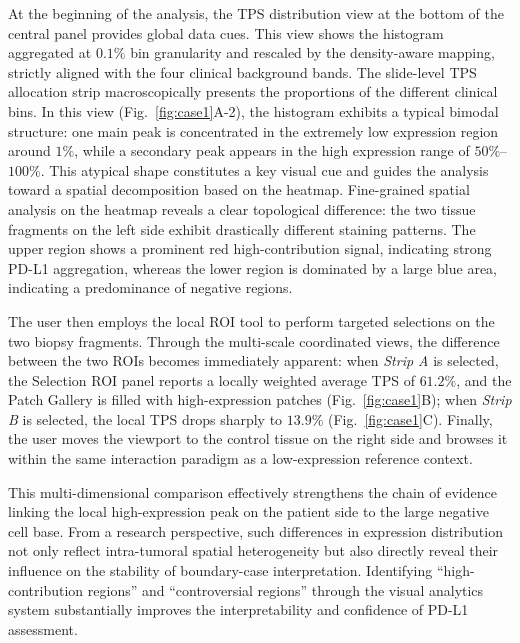 \documentclass[journal]{vgtc}                     %
\begin{document}
At the beginning of the analysis, the TPS distribution view at the bottom of the central panel provides global data cues. This view shows the histogram aggregated at $0.1\%$ bin granularity and rescaled by the density-aware mapping, strictly aligned with the four clinical background bands. The slide-level TPS allocation strip macroscopically presents the proportions of the different clinical bins. In this view (Fig.~\ref{fig:case1}A-2), the histogram exhibits a typical bimodal structure: one main peak is concentrated in the extremely low expression region around $1\%$, while a secondary peak appears in the high expression range of $50\%$--$100\%$. This atypical shape constitutes a key visual cue and guides the analysis toward a spatial decomposition based on the heatmap. Fine-grained spatial analysis on the heatmap reveals a clear topological difference: the two tissue fragments on the left side exhibit drastically different staining patterns. The upper region shows a prominent red high-contribution signal, indicating strong PD-L1 aggregation, whereas the lower region is dominated by a large blue area, indicating a predominance of negative regions.

The user then employs the local ROI tool to perform targeted selections on the two biopsy fragments. Through the multi-scale coordinated views, the difference between the two ROIs becomes immediately apparent: when \textit{Strip A} is selected, the Selection ROI panel reports a locally weighted average TPS of $61.2\%$, and the Patch Gallery is filled with high-expression patches (Fig.~\ref{fig:case1}B); when \textit{Strip B} is selected, the local TPS drops sharply to $13.9\%$ (Fig.~\ref{fig:case1}C). Finally, the user moves the viewport to the control tissue on the right side and browses it within the same interaction paradigm as a low-expression reference context.

This multi-dimensional comparison effectively strengthens the chain of evidence linking the local high-expression peak on the patient side to the large negative cell base. From a research perspective, such differences in expression distribution not only reflect intra-tumoral spatial heterogeneity but also directly reveal their influence on the stability of boundary-case interpretation. Identifying ``high-contribution regions'' and ``controversial regions'' through the visual analytics system substantially improves the interpretability and confidence of PD-L1 assessment.



\end{document}
